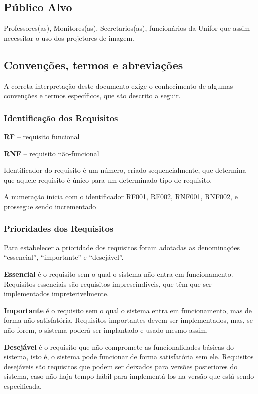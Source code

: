\subsection{Público Alvo}

Professores(as), Monitores(as), Secretarios(as), funcionários da Unifor 
que assim necessitar o uso dos projetores de imagem.

\subsection{Convenções, termos e abreviações}

A correta interpretação deste documento exige o conhecimento de algumas 
convenções e termos específicos, que são descrito a seguir.


\subsubsection{Identificação dos Requisitos} 
\hspace{1.0cm}
  \textbf{RF} – requisito funcional

  \textbf{RNF} – requisito não-funcional

Identificador do requisito é um número, criado sequencialmente, que
determina que aquele requisito é único para um determinado tipo de 
requisito. 

A numeração inicia com o identificador RF001, RF002, RNF001, RNF002, e prossegue 
sendo incrementado 

\subsubsection{Prioridades dos Requisitos}

Para estabelecer a prioridade dos requisitos foram adotadas as 
denominações “essencial”, “importante” e “desejável”. 

\textbf{Essencial} é o requisito sem o qual o sistema não entra em 
funcionamento. Requisitos essenciais são requisitos imprescindíveis, 
que têm que ser implementados impreterivelmente.

\textbf{Importante} é o requisito sem o qual o sistema entra em 
funcionamento, mas de forma não satisfatória. Requisitos importantes 
devem ser implementados, mas, se não forem, o sistema poderá ser 
implantado e usado mesmo assim.

\textbf{Desejável} é o requisito que não compromete as funcionalidades 
básicas do sistema, isto é, o sistema pode funcionar de forma 
satisfatória sem ele. Requisitos desejáveis são requisitos que podem 
ser deixados para versões posteriores do sistema, caso não haja tempo 
hábil para implementá-los na versão que está sendo especificada.


